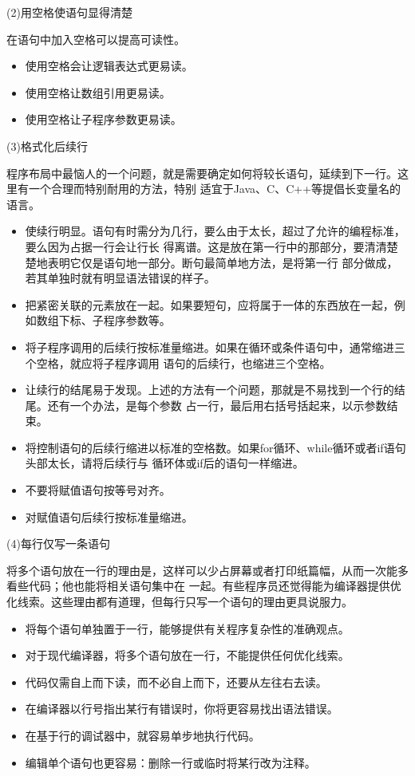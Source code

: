 \documentclass{article}
\begin{document}
\par
(2)用空格使语句显得清楚
\par
在语句中加入空格可以提高可读性。
\begin{itemize}
    \item 使用空格会让逻辑表达式更易读。
    \item 使用空格让数组引用更易读。
    \item 使用空格让子程序参数更易读。
\end{itemize}

\par
(3)格式化后续行
\par
程序布局中最恼人的一个问题，就是需要确定如何将较长语句，延续到下一行。这里有一个合理而特别耐用的方法，特别
适宜于Java、C、C++等提倡长变量名的语言。
\begin{itemize}
    \item 使续行明显。语句有时需分为几行，要么由于太长，超过了允许的编程标准，要么因为占据一行会让行长
    得离谱。这是放在第一行中的那部分，要清清楚楚地表明它仅是语句地一部分。断句最简单地方法，是将第一行
    部分做成，若其单独时就有明显语法错误的样子。
    \item 把紧密关联的元素放在一起。如果要短句，应将属于一体的东西放在一起，例如数组下标、子程序参数等。
    \item 将子程序调用的后续行按标准量缩进。如果在循环或条件语句中，通常缩进三个空格，就应将子程序调用
    语句的后续行，也缩进三个空格。
    \item 让续行的结尾易于发现。上述的方法有一个问题，那就是不易找到一个行的结尾。还有一个办法，是每个参数
    占一行，最后用右括号括起来，以示参数结束。
    \item 将控制语句的后续行缩进以标准的空格数。如果for循环、while循环或者if语句头部太长，请将后续行与
    循环体或if后的语句一样缩进。
    \item 不要将赋值语句按等号对齐。
    \item 对赋值语句后续行按标准量缩进。
\end{itemize}

\par
(4)每行仅写一条语句
\par
将多个语句放在一行的理由是，这样可以少占屏幕或者打印纸篇幅，从而一次能多看些代码；他也能将相关语句集中在
一起。有些程序员还觉得能为编译器提供优化线索。这些理由都有道理，但每行只写一个语句的理由更具说服力。
\begin{itemize}
    \item 将每个语句单独置于一行，能够提供有关程序复杂性的准确观点。
    \item 对于现代编译器，将多个语句放在一行，不能提供任何优化线索。
    \item 代码仅需自上而下读，而不必自上而下，还要从左往右去读。
    \item 在编译器以行号指出某行有错误时，你将更容易找出语法错误。
    \item 在基于行的调试器中，就容易单步地执行代码。
    \item 编辑单个语句也更容易：删除一行或临时将某行改为注释。
\end{itemize}
\end{document}
